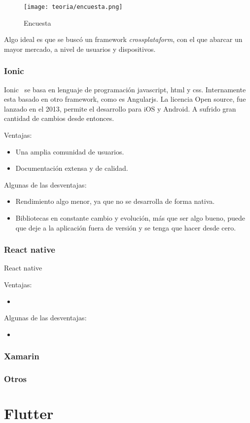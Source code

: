 \begin{figure}[h]
	\centering
	\texttt{[image: teoria/encuesta.png]}
	\caption{Encuesta}\label{fig:encuesta}
\end{figure}

Algo ideal es que se buscó un framework \emph{crossplataform}, con el que abarcar un mayor mercado, a nivel de usuarios y dispositivos.

\subsubsection{Ionic}
Ionic~\cite{wiki:ionnic} se basa en lenguaje de programación javascript, html y css. Internamente esta basado en otro framework, como es Angularjs. La licencia Open source, fue lanzado en el 2013, permite el desarrollo para iOS y Android. A sufrido gran cantidad de cambios desde entonces.

Ventajas:
\begin{itemize}
	\item Una amplia comunidad de usuarios.
	\item Documentación extensa y de calidad.
\end{itemize}

Algunas de las desventajas:
\begin{itemize}
	\item Rendimiento algo menor, ya que no se desarrolla de forma nativa.
	\item Bibliotecas en constante cambio y evolución, más que ser algo bueno, puede que deje a la aplicación fuera de versión y se tenga que hacer desde cero.
\end{itemize}

\subsubsection{React native}
React native~\cite{wiki:ionnic} 

Ventajas:
\begin{itemize}
	\item 
\end{itemize}

Algunas de las desventajas:
\begin{itemize}
	\item 
\end{itemize}

\subsubsection{Xamarin}

\subsubsection{Otros}

\section{Flutter}
